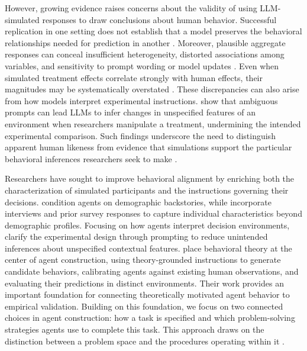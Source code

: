 \documentclass[12pt,letterpaper]{article}
\begin{document}
However, growing evidence raises concerns about the validity of using LLM-simulated responses to draw conclusions about human behavior. Successful replication in one setting does not establish that a model preserves the behavioral relationships needed for prediction in another \citep{manning2026}. Moreover, plausible aggregate responses can conceal insufficient heterogeneity, distorted associations among variables, and sensitivity to prompt wording or model updates \citep{bisbee2024,xie2026}. Even when simulated treatment effects correlate strongly with human effects, their magnitudes may be systematically overstated \citep{ashokkumar2026}. These discrepancies can also arise from how models interpret experimental instructions. \citet{gui2025} show that ambiguous prompts can lead LLMs to infer changes in unspecified features of an environment when researchers manipulate a treatment, undermining the intended experimental comparison. Such findings underscore the need to distinguish apparent human likeness from evidence that simulations support the particular behavioral inferences researchers seek to make \citep{gao2025,hullman2026}.

Researchers have sought to improve behavioral alignment by enriching both the characterization of simulated participants and the instructions governing their decisions. \citet{argyle2023} condition agents on demographic backstories, while \citet{park2026} incorporate interviews and prior survey responses to capture individual characteristics beyond demographic profiles. Focusing on how agents interpret decision environments, \citet{gui2025} clarify the experimental design through prompting to reduce unintended inferences about unspecified contextual features. \citet{manning2026} place behavioral theory at the center of agent construction, using theory-grounded instructions to generate candidate behaviors, calibrating agents against existing human observations, and evaluating their predictions in distinct environments. Their work provides an important foundation for connecting theoretically motivated agent behavior to empirical validation. Building on this foundation, we focus on two connected choices in agent construction: how a task is specified and which problem-solving strategies agents use to complete this task. This approach draws on the distinction between a problem space and the procedures operating within it \citep{simon1971}.
\end{document}
